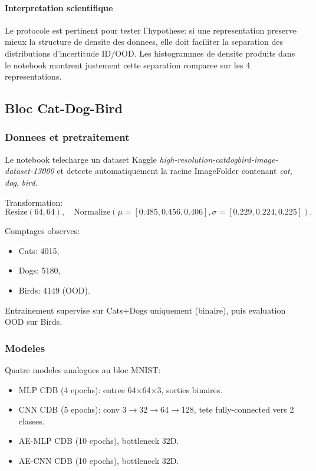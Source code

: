 \documentclass[11pt,a4paper]{article}
\begin{document}
\paragraph{Interpretation scientifique}
Le protocole est pertinent pour tester l'hypothese: si une representation preserve mieux la structure de densite des donnees, elle doit faciliter la separation des distributions d'incertitude ID/OOD. Les histogrammes de densite produits dans le notebook montrent justement cette separation comparee sur les 4 representations.

\subsection{Bloc Cat-Dog-Bird}
\subsubsection{Donnees et pretraitement}
Le notebook telecharge un dataset Kaggle \textit{high-resolution-catdogbird-image-dataset-13000} et detecte automatiquement la racine ImageFolder contenant \textit{cat}, \textit{dog}, \textit{bird}.

Transformation:
\begin{equation}
\text{Resize}(64,64),\quad \text{Normalize}(\mu=[0.485,0.456,0.406],\sigma=[0.229,0.224,0.225]).
\end{equation}

Comptages observes:
\begin{itemize}[leftmargin=1.2cm]
    \item Cats: 4015,
    \item Dogs: 5180,
    \item Birds: 4149 (OOD).
\end{itemize}

Entrainement supervise sur Cats+Dogs uniquement (binaire), puis evaluation OOD sur Birds.

\subsubsection{Modeles}
Quatre modeles analogues au bloc MNIST:
\begin{itemize}[leftmargin=1.2cm]
    \item MLP CDB (4 epochs): entree 64\(\times\)64\(\times\)3, sorties binaires.
    \item CNN CDB (5 epochs): conv 3\(\to\)32\(\to\)64\(\to\)128, tete fully-connected vers 2 classes.
    \item AE-MLP CDB (10 epochs), bottleneck 32D.
    \item AE-CNN CDB (10 epochs), bottleneck 32D.
\end{itemize}
\end{document}
